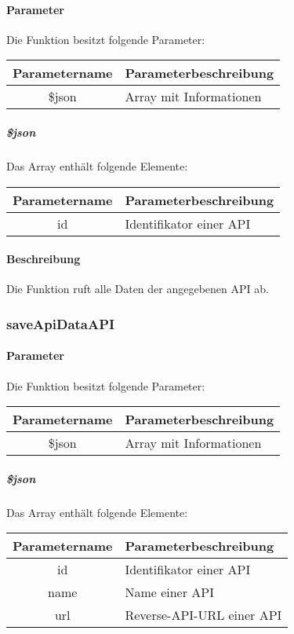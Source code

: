 \paragraph{Parameter} Die Funktion besitzt folgende Parameter:
\begin{table}[H]
	\begin{tabular}{|c|p{11cm}|}
		\hline
		\textbf{Parametername} & \textbf{Parameterbeschreibung} \\ \hline
		\$json & Array mit Informationen \\ \hline
	\end{tabular}
\end{table}
\subparagraph{\$json}Das Array enthält folgende Elemente:
\begin{table}[H]
	\begin{tabular}{|c|p{11cm}|}
		\hline
		\textbf{Parametername} & \textbf{Parameterbeschreibung} \\ \hline
		id     & Identifikator einer API \\ \hline
	\end{tabular}
\end{table}
\paragraph{Beschreibung} Die Funktion ruft alle Daten der angegebenen API ab.
\subsubsection{saveApiDataAPI}
\paragraph{Parameter} Die Funktion besitzt folgende Parameter:
\begin{table}[H]
	\begin{tabular}{|c|p{11cm}|}
		\hline
		\textbf{Parametername} & \textbf{Parameterbeschreibung} \\ \hline
		\$json & Array mit Informationen \\ \hline
	\end{tabular}
\end{table}
\subparagraph{\$json}Das Array enthält folgende Elemente:
\begin{table}[H]
	\begin{tabular}{|c|p{11cm}|}
		\hline
		\textbf{Parametername} & \textbf{Parameterbeschreibung} \\ \hline
		id     & Identifikator einer API \\ \hline
		name   & Name einer API \\ \hline
		url    & Reverse-API-URL einer API \\ \hline
	\end{tabular}
\end{table}
